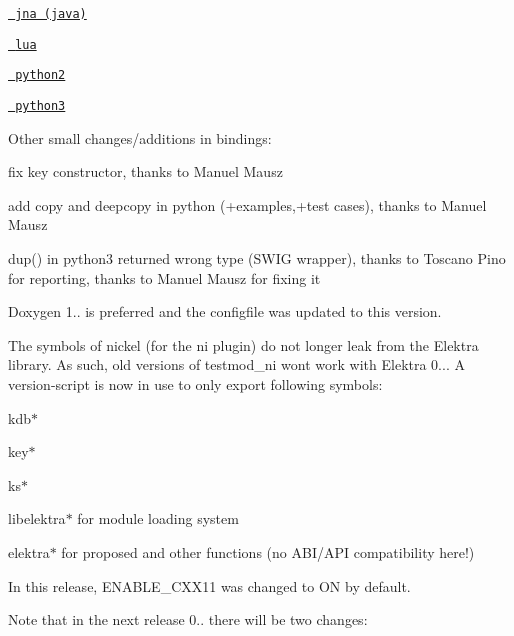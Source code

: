 \begin{DoxyItemize}
\item \href{https://git.libelektra.org/blob/master/src/bindings/jna/HelloElektra.java}{\texttt{ jna (java)}}
\item \href{https://git.libelektra.org/blob/master/src/bindings/swig/lua/tests/test_key.lua}{\texttt{ lua}}
\item \href{https://git.libelektra.org/blob/master/src/bindings/swig/python2/tests/testpy2_key.py}{\texttt{ python2}}
\item \href{https://git.libelektra.org/blob/master/src/bindings/swig/python/tests/test_key.py}{\texttt{ python3}}
\end{DoxyItemize}

Other small changes/additions in bindings\+:


\begin{DoxyItemize}
\item fix key constructor, thanks to Manuel Mausz
\item add copy and deepcopy in python (+examples,+test cases), thanks to Manuel Mausz
\item dup() in python3 returned wrong type (S\+W\+IG wrapper), thanks to Toscano Pino for reporting, thanks to Manuel Mausz for fixing it
\end{DoxyItemize}

Doxygen 1.. is preferred and the configfile was updated to this version.

The symbols of nickel (for the ni plugin) do not longer leak from the Elektra library. As such, old versions of testmod\+\_\+ni won\textquotesingle{}t work with Elektra 0... A version-\/script is now in use to only export following symbols\+:


\begin{DoxyItemize}
\item {\ttfamily kdb$\ast$}
\item {\ttfamily key$\ast$}
\item {\ttfamily ks$\ast$}
\item {\ttfamily libelektra$\ast$} for module loading system
\item {\ttfamily elektra$\ast$} for proposed and other functions (no A\+B\+I/\+A\+PI compatibility here!)
\end{DoxyItemize}

In this release, E\+N\+A\+B\+L\+E\+\_\+\+C\+X\+X11 was changed to {\ttfamily ON} by default.

Note that in the next release 0.. there will be two changes\+:


